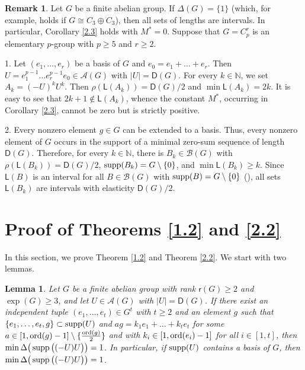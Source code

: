 \documentclass[a4paper,10pt]{amsart}
\theoremstyle{plain}
\newtheorem{lemma}[theorem]{\bf Lemma}
\theoremstyle{definition}
\newtheorem{remark}[theorem]{\bf Remark}
\newcommand{\N}{\mathbb N}
\numberwithin{equation}{section}
\begin{document}
\begin{remark} \label{2.4}
Let $G$ be a finite abelian group. If $\Delta (G) = \{1\}$ (which, for example, holds if $G \cong C_3 \oplus C_3$), then all sets of lengths are intervals. In particular, Corollary \ref{2.3} holds with $M^* = 0$. Suppose that $G = C_p^r$ is an elementary $p$-group with $p \ge 5$ and $r \ge 2$.

1. Let $(e_1, \ldots, e_r)$ be a basis of $G$ and $e_0 = e_1 + \ldots + e_r$. Then $U = e_1^{p-1} \ldots e_r^{p-1} e_0 \in \mathcal A (G)$ with $|U|=\mathsf D (G)$. For  every $k \in \N$, we set $A_k = (-U)^k U^k$. Then $\rho ( \mathsf L (A_k)) = \mathsf D (G)/2$ and $\min \mathsf L (A_k)=2k$. It is easy to see that $2k+1 \notin \mathsf L (A_k)$, whence the constant $M^*$, occurring in Corollary \ref{2.3}, cannot be zero but is strictly positive.

2. Every nonzero element $g \in G$ can be extended to a basis. Thus, every nonzero element of $G$ occurs in the support of a minimal zero-sum sequence of length $\mathsf D (G)$. Therefore, for every $k \in \N$, there is $B_k \in \mathcal B (G)$ with $\rho ( \mathsf L (B_k))= \mathsf D (G)/2$, $\operatorname{supp} (B_k) = G \setminus \{0\}$, and $\min \mathsf L (B_k) \ge k$. Since $\mathsf L (B)$ is an interval for all $B \in \mathcal B (G)$ with $\operatorname{supp} (B)= G \setminus \{0\}$ (\cite[Theorem 7.6.9]{Ge-HK06a}), all sets $\mathsf L (B_k)$ are intervals with elasticity $\mathsf D (G)/2$.
\end{remark}


\section{Proof of  Theorems \ref{1.2} and \ref{2.2}} \label{3}

In this section, we prove Theorem \ref{1.2} and Theorem \ref{2.2}. We start with two lemmas.

\begin{lemma} \label{3.1}
Let $G$ be a finite abelian group with rank $\mathsf r(G)\ge 2$ and $\exp(G)\ge 3$, and let $U\in \mathcal A(G)$  with  $|U|=\mathsf D(G)$. If  there exist an independent tuple $(e_1,\ldots,e_t) \in G^t$ with $t\ge 2$ and an element $g$ such that $\{e_1,\ldots, e_t,g\} \subset \operatorname{supp}(U)$ and $ag=k_1e_1+\ldots+k_te_t$ for some $a\in [1,\operatorname{ord}(g)-1]\setminus\{\frac{\operatorname{ord}(g)}{2}\}$ and with $k_i\in [1, \operatorname{ord}(e_i)-1]$ for all $i\in [1,t]$,  then $\min \Delta \big( \operatorname{supp} \big( (-U)U \big) \big)=1$.  In particular, if $\operatorname{supp}(U)$ contains a basis of $G$, then $\min \Delta \big( \operatorname{supp} \big( (-U)U \big) \big)=1$.
\end{lemma}
\end{document}
